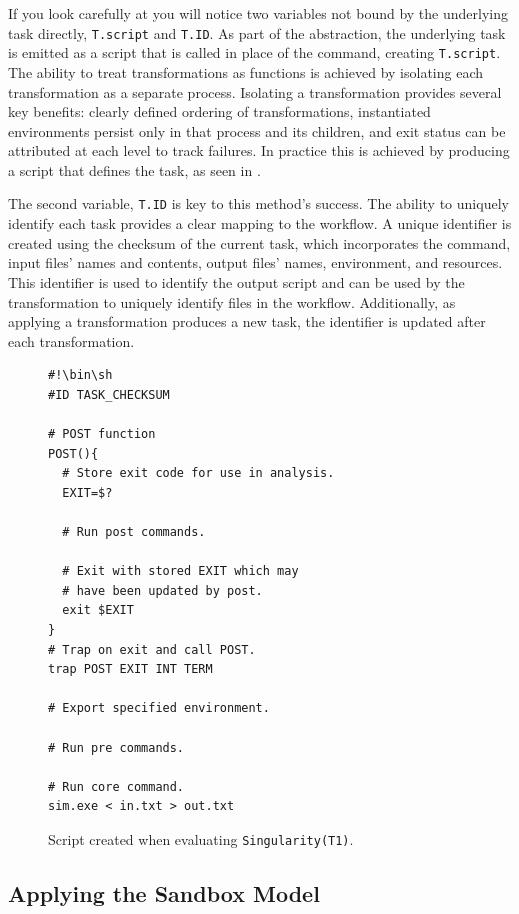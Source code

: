 \documentclass[conference]{IEEEtran}
\begin{document}
If you look carefully at 
you will notice two variables not
bound by the underlying task
directly, {\tt T.script} and {\tt T.ID}.
As part of the abstraction, the 
underlying task is emitted as a script
that is called in place of the command,
creating {\tt T.script}.
The ability to treat transformations as functions 
is achieved by isolating 
each transformation as a separate process.
Isolating a transformation provides 
several key benefits:
clearly defined ordering of transformations,
instantiated environments persist only 
in that process and its children,
and exit status can be attributed 
at each level to track failures.
In practice this is achieved by 
producing a script that
defines the task, as seen in .

The second variable, {\tt T.ID}
is key to this method's success.
The ability to uniquely identify
each task provides a clear
mapping to the workflow.
A unique identifier is created
using the checksum of the
current task, which incorporates the
command, input files' names and contents,
output files' names, environment, and
resources. 
This identifier is used to identify the output
script and can be used by the
transformation to uniquely identify 
files in the workflow.
Additionally, as applying a transformation
produces a new task, the identifier 
is updated after each transformation.

\begin{figure}[h]
\begin{framed}
\small
\begin{verbatim}
#!\bin\sh
#ID TASK_CHECKSUM

# POST function
POST(){
  # Store exit code for use in analysis.
  EXIT=$?
  
  # Run post commands.
  
  # Exit with stored EXIT which may
  # have been updated by post.
  exit $EXIT
}
# Trap on exit and call POST.
trap POST EXIT INT TERM

# Export specified environment.

# Run pre commands.

# Run core command.
sim.exe < in.txt > out.txt
\end{verbatim}
\end{framed}
\caption{Script created when evaluating {\tt Singularity(T1)}.}
\label{task-script}
\end{figure}


\subsection{Applying the Sandbox Model}
\end{document}

